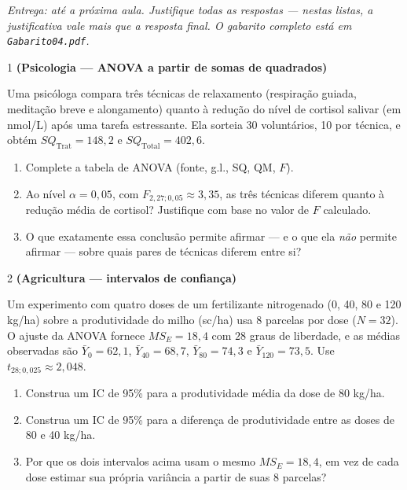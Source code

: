 \documentclass[11pt]{article}
\begin{document}

\noindent \textit{Entrega: até a próxima aula. Justifique todas as respostas --- nestas listas, a
justificativa vale mais que a resposta final. O gabarito completo está em \texttt{Gabarito04.pdf}.}

\begin{questao}{1} \textbf{(Psicologia --- ANOVA a partir de somas de quadrados)}

Uma psicóloga compara três técnicas de relaxamento (respiração guiada, meditação breve e
alongamento) quanto à redução do nível de cortisol salivar (em nmol/L) após uma tarefa
estressante. Ela sorteia 30 voluntários, 10 por técnica, e obtém $SQ_{\text{Trat}} = 148{,}2$ e
$SQ_{\text{Total}} = 402{,}6$.

\begin{enumerate}[label=(\alph*)]
  \item Complete a tabela de ANOVA (fonte, g.l., SQ, QM, $F$).
  \item Ao nível $\alpha = 0{,}05$, com $F_{2,27;0{,}05} \approx 3{,}35$, as três técnicas diferem
    quanto à redução média de cortisol? Justifique com base no valor de $F$ calculado.
  \item O que exatamente essa conclusão permite afirmar --- e o que ela \emph{não} permite
    afirmar --- sobre quais pares de técnicas diferem entre si?
\end{enumerate}
\end{questao}

\begin{questao}{2} \textbf{(Agricultura --- intervalos de confiança)}

Um experimento com quatro doses de um fertilizante nitrogenado (0, 40, 80 e 120 kg/ha) sobre a
produtividade do milho (sc/ha) usa 8 parcelas por dose ($N=32$). O ajuste da ANOVA fornece
$MS_E = 18{,}4$ com $28$ graus de liberdade, e as médias observadas são $\bar Y_{0} = 62{,}1$,
$\bar Y_{40} = 68{,}7$, $\bar Y_{80} = 74{,}3$ e $\bar Y_{120} = 73{,}5$. Use
$t_{28;0{,}025} \approx 2{,}048$.

\begin{enumerate}[label=(\alph*)]
  \item Construa um IC de 95\% para a produtividade média da dose de 80 kg/ha.
  \item Construa um IC de 95\% para a diferença de produtividade entre as doses de 80 e 40 kg/ha.
  \item Por que os dois intervalos acima usam o mesmo $MS_E = 18{,}4$, em vez de cada dose estimar
    sua própria variância a partir de suas 8 parcelas?
\end{enumerate}
\end{questao}
\end{document}
